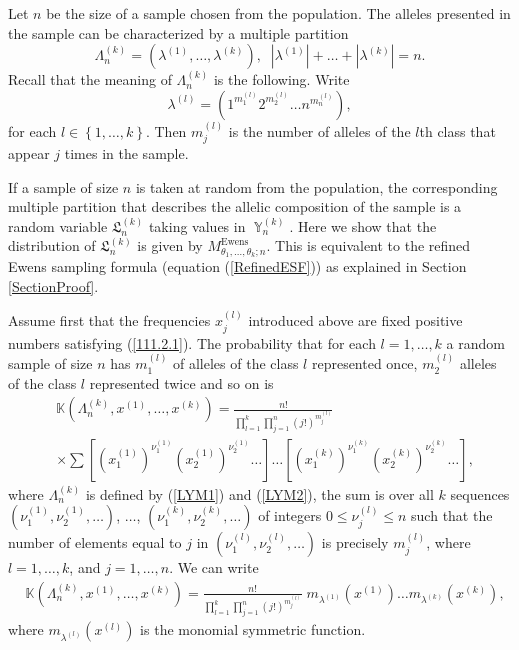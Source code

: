 \documentclass[12pt]{amsart}
\theoremstyle{definition}
\numberwithin{equation}{section}
\DeclareMathOperator{\Y}{\mathbb{Y}}
\DeclareMathOperator{\Ewens}{Ewens}
\begin{document}
Let $n$ be the size of a sample chosen from the population. The alleles presented in the sample can be characterized by a multiple partition
\begin{equation}\label{LYM1}
\Lambda_n^{(k)}=\left(\lambda^{(1)},\ldots,\lambda^{(k)}\right),
\;\;|\lambda^{(1)}|+\ldots+|\lambda^{(k)}|=n.
\end{equation}
Recall that the meaning of $\Lambda_n^{(k)}$ is the following. Write
\begin{equation}\label{LYM2}
\lambda^{(l)}=\left(1^{m_1^{(l)}}2^{m_2^{(l)}}\ldots n^{m_n^{(l)}}\right),
\end{equation}
for each $l\in\left\{1,\ldots,k\right\}$. Then $m_j^{(l)}$ is the number of alleles of the $l$th class that appear $j$ times in the sample.

If a sample of size $n$ is taken at random from the population, the corresponding multiple partition that describes the allelic composition of the sample is a random variable
$\mathfrak{L}_n^{(k)}$ taking values in $\Y_n^{(k)}$. Here we show that the distribution of $\mathfrak{L}_n^{(k)}$ is given by $M^{\Ewens}_{\theta_1,\ldots,\theta_k; n}$.
This is equivalent to the refined Ewens sampling formula (equation (\ref{RefinedESF}))
as explained in Section \ref{SectionProof}.

Assume first that the frequencies $x_j^{(l)}$ introduced above are fixed positive numbers satisfying (\ref{111.2.1}). The probability that for each $l=1,\ldots,k$  a random sample of size $n$ has $m_1^{(l)}$ of alleles of the class
$l$ represented once, $m_2^{(l)}$ alleles of the class $l$ represented twice and so on is
\begin{equation}
\begin{split}
&\mathbb{K}\left(\Lambda_n^{(k)},x^{(1)},\ldots,x^{(k)}\right)
=\frac{n!}{\prod_{l=1}^k\prod_{j=1}^n\left(j!\right)^{m_j^{(l)}}}\\
&\times
\sum\left[\left(x_1^{(1)}\right)^{\nu_1^{(1)}}\left(x_2^{(1)}\right)^{\nu_2^{(1)}}\ldots\right]
\ldots\left[\left(x_1^{(k)}\right)^{\nu_1^{(k)}}\left(x_2^{(k)}\right)^{\nu_2^{(k)}}\ldots\right],
\end{split}
\end{equation}
where  $\Lambda_n^{(k)}$ is defined by (\ref{LYM1}) and (\ref{LYM2}), the sum is over all $k$ sequences $\left(\nu_1^{(1)},\nu_2^{(1)},\ldots\right)$,
$\ldots$, $\left(\nu_1^{(k)},\nu_2^{(k)},\ldots\right)$ of integers $0\leq\nu_j^{(l)}\leq n$
such that the number of elements equal to $j$ in $\left(\nu_1^{(l)},\nu_2^{(l)},\ldots\right)$
is precisely $m_j^{(l)}$, where $l=1,\ldots,k$, and $j=1,\ldots,n$. We can write
\begin{equation}
\begin{split}
&\mathbb{K}\left(\Lambda_n^{(k)},x^{(1)},\ldots,x^{(k)}\right)
=\frac{n!}{\prod_{l=1}^k\prod_{j=1}^n\left(j!\right)^{m_j^{(l)}}}\;
m_{\lambda^{(1)}}\left(x^{(1)}\right)\ldots m_{\lambda^{(k)}}\left(x^{(k)}\right),
\end{split}
\end{equation}
where $m_{\lambda^{(l)}}\left(x^{(l)}\right)$ is the monomial symmetric function.
\end{document}
